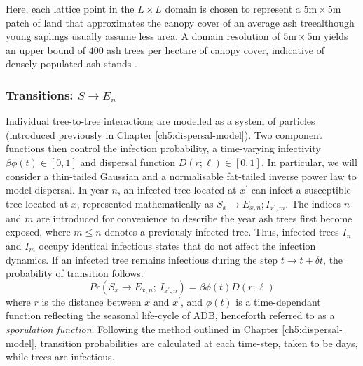 Here, each lattice point in the $L\times L$ domain is chosen to represent a $5\mathrm{m}\times5\mathrm{m}$ patch of land
that approximates the canopy cover of an average ash tree\textemdash although young saplings usually assume less area. 
A domain resolution of $5\mathrm{m}\times5\mathrm{m}$ yields an upper bound of $400$ ash trees per hectare of canopy cover, 
indicative of densely populated ash stands \cite{ash-tree2, ash-tree1}.

\newpage 

\subsubsection{Transitions: $S\rightarrow E_n$}

Individual tree-to-tree interactions are modelled as a system of particles (introduced previously in Chapter \ref{ch5:dispersal-model}). Two component functions then control the infection probability, a time-varying infectivity $\beta\phi(t)\in [0, 1]$ and dispersal function $D(r; \ell)\in [0, 1]$. In particular, we will consider a thin-tailed Gaussian and a normalisable fat-tailed inverse power law to model dispersal.
In year $n$, an infected tree located at $x^\prime$ can infect a susceptible tree located at $x$, represented mathematically as $S_x \rightarrow E_{x,n}; I_{x^\prime, m}$. The indices $n$ and $m$ are introduced for convenience to describe the year ash trees first become exposed, where $m\leq n$ denotes a previously infected tree. Thus, infected trees $I_n$ and $I_{m}$ occupy identical infectious states that do not affect the infection dynamics. If an infected tree remains infectious during the step $t\rightarrow t + \delta t$, the probability of transition follows:
\begin{equation}
    Pr(S_{x} \rightarrow E_{x,n} ;\ I_{x^{\prime}, n} ) = \beta  \phi(t) D(r;\ell)
\end{equation}
where $r$ is the distance between $x$ and $x^{\prime}$, and $\phi(t)$ is a time-dependant function reflecting the seasonal life-cycle of ADB, 
henceforth referred to as a \textit{sporulation function}. Following the method outlined in Chapter \ref{ch5:dispersal-model}, 
transition probabilities are calculated at each time-step, taken to be days, while trees are infectious.

